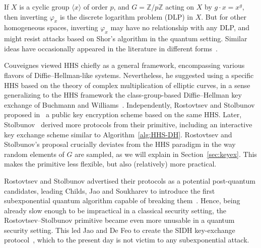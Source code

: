 \documentclass{llncs}
\begin{document}


If $X$ is a
cyclic group $〈x〉$ of order $p$, and $G=ℤ/pℤ$ acting on $X$ by
$g·x=x^g$, then %
inverting $φ_x$ is the discrete logarithm problem (DLP) in $X$.
But for other homogeneous spaces, inverting $φ_x$ may have no relationship
with any DLP,
and might resist attacks based on Shor's algorithm in the quantum setting.
Similar ideas have occasionally appeared in the
literature in different forms~\cite{10.1007/3-540-44598-6_10,monico2007}.

Couveignes viewed HHS chiefly as a general framework, encompassing
various flavors of Diffie--Hellman-like systems. Nevertheless, he
suggested using a specific HHS based on the theory of complex
multiplication of elliptic curves, in a sense generalizing to the HHS
framework the class-group-based Diffie--Hellman key exchange of
Buchmann and Williams~\cite{Buchmann1988}. Independently, Rostovtsev
and Stolbunov proposed in~\cite{rostovtsev+stolbunov06} a public key
encryption scheme based on the same HHS. Later, Stolbunov~\cite{Stol}
derived more protocols from their primitive, including an interactive
key exchange scheme similar to Algorithm~\ref{alg:HHS-DH}.  Rostovtsev
and Stolbunov's proposal crucially deviates from the HHS paradigm in
the way random elements of $G$ are sampled, as we will explain in
Section~\ref{sec:keyex}. This makes the primitive less flexible, but
also (relatively) more practical.

Rostovtsev and Stolbunov advertised their protocols as a potential
post-quantum candidates, leading Childs, Jao and Soukharev to introduce
the first subexponential quantum algorithm capable of breaking
them~\cite{childs2014constructing}. Hence, being already slow enough to
be impractical in a classical security setting, the
Rostovtsev--Stolbunov primitive became even more unusable in a quantum
security setting. This led Jao and De Feo to create the SIDH
key-exchange protocol~\cite{jao+defeo2011}, which to the present day
is not victim to any subexponential attack.
\end{document}
